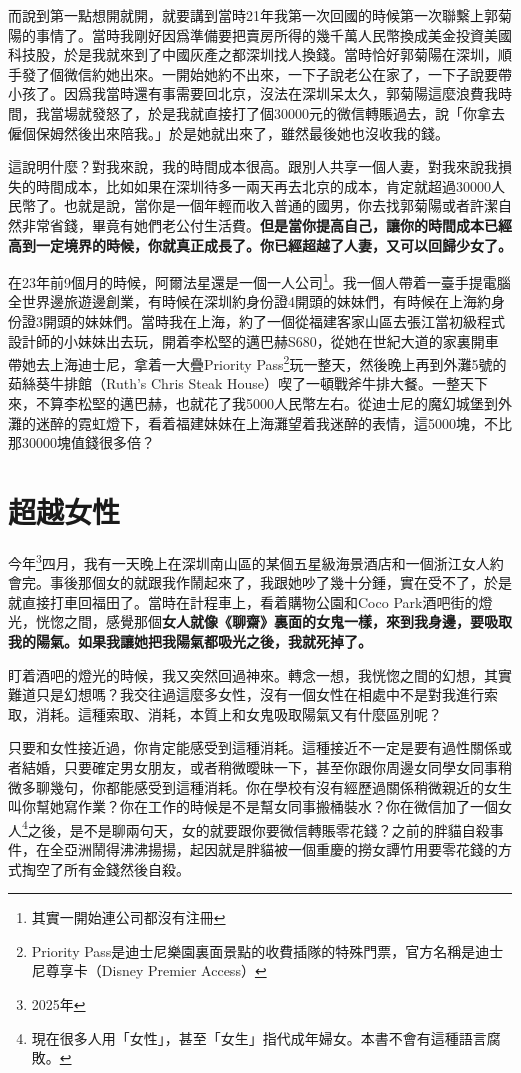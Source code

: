 而說到第一點想開就開，就要講到當時21年我第一次回國的時候第一次聯繫上郭菊陽的事情了。當時我剛好因爲準備要把賣房所得的幾千萬人民幣換成美金投資美國科技股，於是我就來到了中國灰產之都深圳找人換錢。當時恰好郭菊陽在深圳，順手發了個微信約她出來。一開始她約不出來，一下子說老公在家了，一下子說要帶小孩了。因爲我當時還有事需要回北京，沒法在深圳呆太久，郭菊陽這麼浪費我時間，我當場就發怒了，於是我就直接打了個30000元的微信轉賬過去，說「你拿去僱個保姆然後出來陪我。」於是她就出來了，雖然最後她也沒收我的錢。

這說明什麼？對我來說，我的時間成本很高。跟別人共享一個人妻，對我來說我損失的時間成本，比如如果在深圳待多一兩天再去北京的成本，肯定就超過30000人民幣了。也就是說，當你是一個年輕而收入普通的國男，你去找郭菊陽或者許潔自然非常省錢，畢竟有她們老公付生活費。\textbf{但是當你提高自己，讓你的時間成本已經高到一定境界的時候，你就真正成長了。你已經超越了人妻，又可以回歸少女了。}

在23年前9個月的時候，阿爾法星還是一個一人公司\footnote{其實一開始連公司都沒有注冊}。我一個人帶着一臺手提電腦全世界邊旅遊邊創業，有時候在深圳約身份證4開頭的妹妹們，有時候在上海約身份證3開頭的妹妹們。當時我在上海，約了一個從福建客家山區去張江當初級程式設計師的小妹妹出去玩，開着李松堅的邁巴赫S680，從她在世紀大道的家裏開車帶她去上海迪士尼，拿着一大疊Priority Pass\footnote{Priority Pass是迪士尼樂園裏面景點的收費插隊的特殊門票，官方名稱是迪士尼尊享卡（Disney Premier Access）}玩一整天，然後晚上再到外灘5號的茹絲葵牛排館（Ruth's Chris Steak House）喫了一頓戰斧牛排大餐。一整天下來，不算李松堅的邁巴赫，也就花了我5000人民幣左右。從迪士尼的魔幻城堡到外灘的迷醉的霓虹燈下，看着福建妹妹在上海灘望着我迷醉的表情，這5000塊，不比那30000塊值錢很多倍？

\section{超越女性}

今年\footnote{2025年}四月，我有一天晚上在深圳南山區的某個五星級海景酒店和一個浙江女人約會完。事後那個女的就跟我作鬧起來了，我跟她吵了幾十分鍾，實在受不了，於是就直接打車回福田了。當時在計程車上，看着購物公園和Coco Park酒吧街的燈光，恍惚之間，感覺那個\textbf{女人就像《聊齋》裏面的女鬼一樣，來到我身邊，要吸取我的陽氣。如果我讓她把我陽氣都吸光之後，我就死掉了。}

盯着酒吧的燈光的時候，我又突然回過神來。轉念一想，我恍惚之間的幻想，其實難道只是幻想嗎？我交往過這麼多女性，沒有一個女性在相處中不是對我進行索取，消耗。這種索取、消耗，本質上和女鬼吸取陽氣又有什麼區別呢？

只要和女性接近過，你肯定能感受到這種消耗。這種接近不一定是要有過性關係或者結婚，只要確定男女朋友，或者稍微曖昧一下，甚至你跟你周邊女同學女同事稍微多聊幾句，你都能感受到這種消耗。你在學校有沒有經歷過關係稍微親近的女生叫你幫她寫作業？你在工作的時候是不是幫女同事搬桶裝水？你在微信加了一個女人\footnote{現在很多人用「女性」，甚至「女生」指代成年婦女。本書不會有這種語言腐敗。}之後，是不是聊兩句天，女的就要跟你要微信轉賬零花錢？之前的胖貓自殺事件，在全亞洲鬧得沸沸揚揚，起因就是胖貓被一個重慶的撈女譚竹用要零花錢的方式掏空了所有金錢然後自殺。

